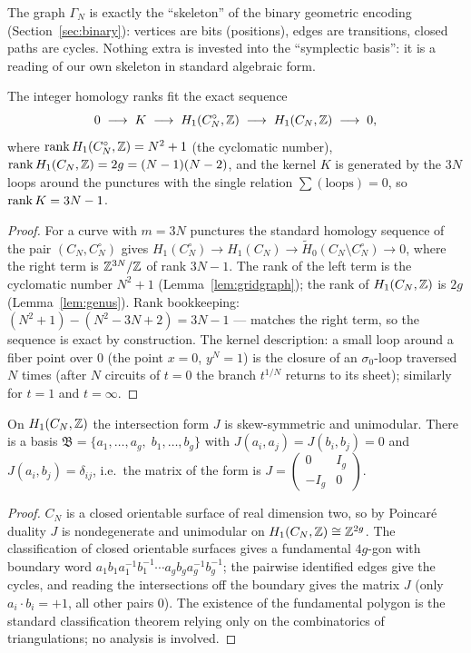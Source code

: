 \begin{remark}
The graph $\Gamma_N$ is exactly the ``skeleton'' of the binary
geometric encoding (Section~\ref{sec:binary}): vertices are bits
(positions), edges are transitions, closed paths are cycles. Nothing
extra is invested into the ``symplectic basis'': it is a reading of
our own skeleton in standard algebraic form.
\end{remark}

\begin{lemma}\label{lem:capping}
The integer homology ranks fit the exact sequence
\[
  0\;\longrightarrow\; K\;\longrightarrow\;
  H_1(C_N^\circ,\mathbb{Z})\;\longrightarrow\;H_1(C_N,\mathbb{Z})\;\longrightarrow\;0,
\]
where $\operatorname{rank} H_1(C_N^\circ,\mathbb{Z})=N^2+1$ (the cyclomatic number),
$\operatorname{rank} H_1(C_N,\mathbb{Z})=2g=(N-1)(N-2)$, and the kernel $K$ is generated
by the $3N$ loops around the punctures with the single relation
$\sum(\text{loops})=0$, so $\operatorname{rank} K=3N-1$.
\end{lemma}

\begin{proof}
For a curve with $m=3N$ punctures the standard homology sequence of
the pair $(C_N,C_N^\circ)$ gives
$H_1(C_N^\circ)\to H_1(C_N)\to\widetilde H_0(C_N\setminus C_N^\circ)
\to 0$, where the right term is $\mathbb{Z}^{3N}/\mathbb{Z}$ of rank $3N-1$. The
rank of the left term is the cyclomatic number $N^2+1$
(Lemma~\ref{lem:gridgraph}); the rank of $H_1(C_N,\mathbb{Z})$ is $2g$
(Lemma~\ref{lem:genus}). Rank bookkeeping:
$(N^2+1)-(N^2-3N+2)=3N-1$ --- matches the right term, so the
sequence is exact by construction. The kernel description: a small
loop around a fiber point over $0$ (the point $x=0$, $y^N=1$) is the
closure of an $\sigma_0$-loop traversed $N$ times (after $N$
circuits of $t=0$ the branch $t^{1/N}$ returns to its sheet);
similarly for $t=1$ and $t=\infty$.
\end{proof}

\begin{lemma}\label{lem:sympl}
On $H_1(C_N,\mathbb{Z})$ the intersection form $J$ is skew-symmetric and
unimodular. There is a basis
$\mathfrak{B}=\{a_1,\dots,a_g,\; b_1,\dots,b_g\}$ with
$J(a_i,a_j)=J(b_i,b_j)=0$ and $J(a_i,b_j)=\delta_{ij}$, i.e.\ the
matrix of the form is
$J=\begin{pmatrix}0&I_g\\-I_g&0\end{pmatrix}$.
\end{lemma}

\begin{proof}
$C_N$ is a closed orientable surface of real dimension two, so by
Poincar\'e duality $J$ is nondegenerate and unimodular on
$H_1(C_N,\mathbb{Z})\cong\mathbb{Z}^{2g}$. The classification of closed orientable
surfaces gives a fundamental $4g$-gon with boundary word
$a_1b_1a_1^{-1}b_1^{-1}\cdots a_gb_ga_g^{-1}b_g^{-1}$; the pairwise
identified edges give the cycles, and reading the intersections off
the boundary gives the matrix $J$ (only $a_i\cdot b_i=+1$, all other
pairs $0$). The existence of the fundamental polygon is the standard
classification theorem relying only on the combinatorics of
triangulations; no analysis is involved.
\end{proof}

